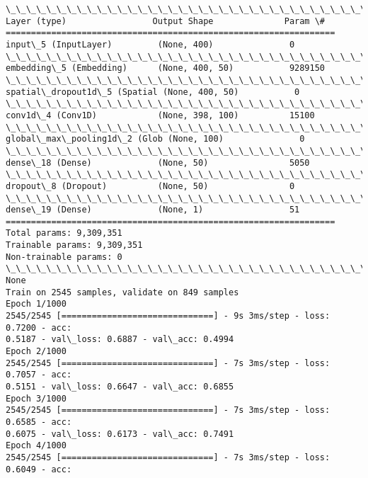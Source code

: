 \documentclass[11pt]{article}
\begin{document}
    \begin{Verbatim}[commandchars=\\\{\}]
\_\_\_\_\_\_\_\_\_\_\_\_\_\_\_\_\_\_\_\_\_\_\_\_\_\_\_\_\_\_\_\_\_\_\_\_\_\_\_\_\_\_\_\_\_\_\_\_\_\_\_\_\_\_\_\_\_\_\_\_\_\_\_\_\_
Layer (type)                 Output Shape              Param \#
=================================================================
input\_5 (InputLayer)         (None, 400)               0
\_\_\_\_\_\_\_\_\_\_\_\_\_\_\_\_\_\_\_\_\_\_\_\_\_\_\_\_\_\_\_\_\_\_\_\_\_\_\_\_\_\_\_\_\_\_\_\_\_\_\_\_\_\_\_\_\_\_\_\_\_\_\_\_\_
embedding\_5 (Embedding)      (None, 400, 50)           9289150
\_\_\_\_\_\_\_\_\_\_\_\_\_\_\_\_\_\_\_\_\_\_\_\_\_\_\_\_\_\_\_\_\_\_\_\_\_\_\_\_\_\_\_\_\_\_\_\_\_\_\_\_\_\_\_\_\_\_\_\_\_\_\_\_\_
spatial\_dropout1d\_5 (Spatial (None, 400, 50)           0
\_\_\_\_\_\_\_\_\_\_\_\_\_\_\_\_\_\_\_\_\_\_\_\_\_\_\_\_\_\_\_\_\_\_\_\_\_\_\_\_\_\_\_\_\_\_\_\_\_\_\_\_\_\_\_\_\_\_\_\_\_\_\_\_\_
conv1d\_4 (Conv1D)            (None, 398, 100)          15100
\_\_\_\_\_\_\_\_\_\_\_\_\_\_\_\_\_\_\_\_\_\_\_\_\_\_\_\_\_\_\_\_\_\_\_\_\_\_\_\_\_\_\_\_\_\_\_\_\_\_\_\_\_\_\_\_\_\_\_\_\_\_\_\_\_
global\_max\_pooling1d\_2 (Glob (None, 100)               0
\_\_\_\_\_\_\_\_\_\_\_\_\_\_\_\_\_\_\_\_\_\_\_\_\_\_\_\_\_\_\_\_\_\_\_\_\_\_\_\_\_\_\_\_\_\_\_\_\_\_\_\_\_\_\_\_\_\_\_\_\_\_\_\_\_
dense\_18 (Dense)             (None, 50)                5050
\_\_\_\_\_\_\_\_\_\_\_\_\_\_\_\_\_\_\_\_\_\_\_\_\_\_\_\_\_\_\_\_\_\_\_\_\_\_\_\_\_\_\_\_\_\_\_\_\_\_\_\_\_\_\_\_\_\_\_\_\_\_\_\_\_
dropout\_8 (Dropout)          (None, 50)                0
\_\_\_\_\_\_\_\_\_\_\_\_\_\_\_\_\_\_\_\_\_\_\_\_\_\_\_\_\_\_\_\_\_\_\_\_\_\_\_\_\_\_\_\_\_\_\_\_\_\_\_\_\_\_\_\_\_\_\_\_\_\_\_\_\_
dense\_19 (Dense)             (None, 1)                 51
=================================================================
Total params: 9,309,351
Trainable params: 9,309,351
Non-trainable params: 0
\_\_\_\_\_\_\_\_\_\_\_\_\_\_\_\_\_\_\_\_\_\_\_\_\_\_\_\_\_\_\_\_\_\_\_\_\_\_\_\_\_\_\_\_\_\_\_\_\_\_\_\_\_\_\_\_\_\_\_\_\_\_\_\_\_
None
Train on 2545 samples, validate on 849 samples
Epoch 1/1000
2545/2545 [==============================] - 9s 3ms/step - loss: 0.7200 - acc:
0.5187 - val\_loss: 0.6887 - val\_acc: 0.4994
Epoch 2/1000
2545/2545 [==============================] - 7s 3ms/step - loss: 0.7057 - acc:
0.5151 - val\_loss: 0.6647 - val\_acc: 0.6855
Epoch 3/1000
2545/2545 [==============================] - 7s 3ms/step - loss: 0.6585 - acc:
0.6075 - val\_loss: 0.6173 - val\_acc: 0.7491
Epoch 4/1000
2545/2545 [==============================] - 7s 3ms/step - loss: 0.6049 - acc:

\end{Verbatim}
\end{document}
